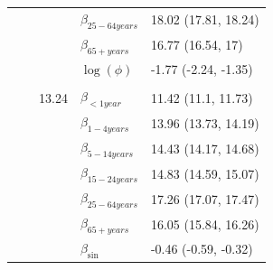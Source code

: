 \documentclass[a4paper,twoside,11pt]{report} %
\theoremstyle{definition}
\theoremstyle{definition}
\theoremstyle{definition}
\theoremstyle{definition}
\theoremstyle{remark}
\begin{document}
\begin{longtable}[t]{llrll}
\hspace{1em}\hspace{1em} &  &  & $\beta_{25-64 years}$ & 18.02 (17.81, 18.24)\\

\hspace{1em}\hspace{1em} &  &  & $\beta_{65+ years}$ & 16.77 (16.54, 17)\\

\hspace{1em}\hspace{1em} &  &  & $\log(\phi)$ & -1.77 (-2.24, -1.35)\\
\cmidrule{2-5}
\addlinespace[0.3em]
\multicolumn{5}{l}{\begin{math}\log(\lambda_{it})=\beta(ageGroup_{i})+\beta_{\sin}\sin\Big(\frac{\pi\cdot \tau_{t}}{6}\Big) + \beta_{\cos} \cos\Big(\frac{\pi \cdot \tau_{t}}{6}\Big)+\log(n_{it})\end{math}}\\
\hspace{1em}\hspace{1em} &  & 13.24 & $\beta_{<1 year}$ & 11.42 (11.1, 11.73)\\

\hspace{1em}\hspace{1em} &  &  & $\beta_{1-4 years}$ & 13.96 (13.73, 14.19)\\

\hspace{1em}\hspace{1em} &  &  & $\beta_{5-14 years}$ & 14.43 (14.17, 14.68)\\

\hspace{1em}\hspace{1em} &  &  & $\beta_{15-24 years}$ & 14.83 (14.59, 15.07)\\

\hspace{1em}\hspace{1em} &  &  & $\beta_{25-64 years}$ & 17.26 (17.07, 17.47)\\

\hspace{1em}\hspace{1em} &  &  & $\beta_{65+ years}$ & 16.05 (15.84, 16.26)\\

\hspace{1em}\hspace{1em} &  &  & $\beta_{\sin}$ & -0.46 (-0.59, -0.32)\\


\end{longtable}
\end{document}
